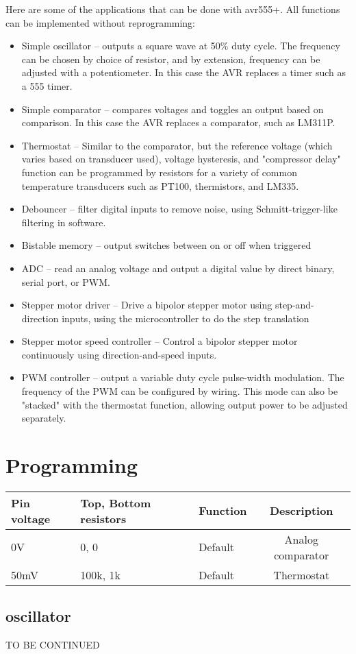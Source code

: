 \documentclass[dvips,12pt]{article}
\begin{document}
Here are some of the applications that can be done with avr555+. All functions can be implemented without reprogramming:
\begin{itemize}
\item Simple oscillator -- outputs a square wave at 50\% duty cycle. The frequency can be chosen by choice of resistor, and by extension, frequency can be adjusted with a potentiometer. In this case the AVR replaces a timer such as a 555 timer.\\
\item Simple comparator -- compares voltages and toggles an output based on comparison. In this case the AVR replaces a comparator, such as LM311P.
\item Thermostat -- Similar to the comparator, but the reference voltage (which varies based on transducer used), voltage hysteresis, and "compressor delay" function can be programmed by resistors for a variety of common temperature transducers such as PT100, thermistors, and LM335.
\item Debouncer -- filter digital inputs to remove noise, using Schmitt-trigger-like filtering in software.
\item Bistable memory -- output switches between on or off when triggered
\item ADC -- read an analog voltage and output a digital value by direct binary, serial port, or PWM.
\item Stepper motor driver -- Drive a bipolor stepper motor using step-and-direction inputs, using the microcontroller to do the step translation
\item Stepper motor speed controller -- Control a bipolor stepper motor continuously using direction-and-speed inputs.
\item PWM controller -- output a variable duty cycle pulse-width modulation. The frequency of the PWM can be configured by wiring. This mode can also be "stacked" with the thermostat function, allowing output power to be adjusted separately.

\end{itemize}

\section{Programming}

\begin{tabular}{|l|l|l|c|}
\hline
Pin voltage & Top, Bottom resistors & Function & Description\\
\hline
0V& 0, 0 &Default  & Analog comparator\\
\hline
50mV& 100k, 1k& Default  & Thermostat \\
\hline
\end {tabular}

\subsection{oscillator}


\vspace{2cm}
\centering
TO BE CONTINUED
\appendix
\end{document}
